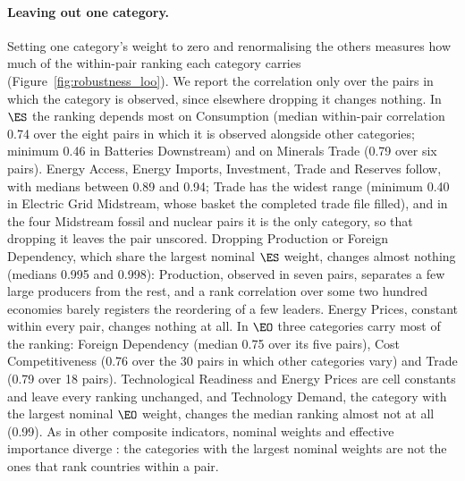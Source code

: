 \paragraph{Leaving out one category.} Setting one category's weight to zero and renormalising
the others measures how much of the within-pair ranking each category carries
(Figure~\ref{fig:robustness_loo}). We report the correlation only over the pairs in which the
category is observed, since elsewhere dropping it changes nothing. In $\ES$ the ranking depends
most on Consumption (median within-pair correlation 0.74 over the eight pairs in which it is
observed alongside other categories; minimum 0.46 in Batteries Downstream) and on Minerals Trade
(0.79 over six pairs). Energy Access, Energy Imports, Investment, Trade and Reserves follow, with
medians between 0.89 and 0.94; Trade has the widest range (minimum 0.40 in Electric Grid
Midstream, whose basket the completed trade file filled), and in the four Midstream fossil and nuclear pairs it is the
only category, so that dropping it leaves the pair unscored. Dropping Production or Foreign
Dependency, which share the largest nominal $\ES$ weight, changes almost nothing (medians 0.995
and 0.998): Production, observed in seven pairs, separates a few large producers from the rest,
and a rank correlation over some two hundred economies barely registers the reordering of a few
leaders. Energy Prices, constant within every pair, changes nothing at
all. In $\EO$ three categories carry most of the ranking: Foreign Dependency (median 0.75 over
its five pairs), Cost Competitiveness (0.76 over the 30 pairs in which other categories vary)
and Trade (0.79 over 18 pairs). Technological Readiness and Energy Prices are cell constants and
leave every ranking unchanged, and Technology Demand, the category with the largest nominal
$\EO$ weight, changes the median ranking almost not at all (0.99). As in other composite
indicators, nominal weights and effective importance diverge
\citep{paruolo2013ratings, becker2017weights}: the categories with the largest nominal weights
are not the ones that rank countries within a pair.

